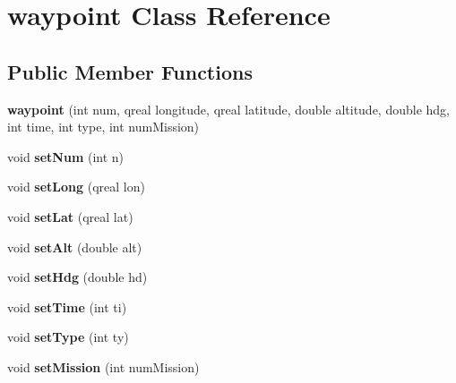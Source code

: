 \hypertarget{classwaypoint}{\section{waypoint Class Reference}
\label{classwaypoint}
}
\subsection*{Public Member Functions}
\begin{DoxyCompactItemize}
\item 
\hypertarget{classwaypoint_a48196deeabf4374d7e26b7e725293ab3}{{\bfseries waypoint} (int num, qreal longitude, qreal latitude, double altitude, double hdg, int time, int type, int num\-Mission)}\label{classwaypoint_a48196deeabf4374d7e26b7e725293ab3}

\item 
\hypertarget{classwaypoint_aad33368c517f7e01d8d2c4c9f60f6e94}{void {\bfseries set\-Num} (int n)}\label{classwaypoint_aad33368c517f7e01d8d2c4c9f60f6e94}

\item 
\hypertarget{classwaypoint_a0d3892775f4a17cd7b88ed05aa1a6223}{void {\bfseries set\-Long} (qreal lon)}\label{classwaypoint_a0d3892775f4a17cd7b88ed05aa1a6223}

\item 
\hypertarget{classwaypoint_a4380ed9b8f41100aad716fafee9ed52d}{void {\bfseries set\-Lat} (qreal lat)}\label{classwaypoint_a4380ed9b8f41100aad716fafee9ed52d}

\item 
\hypertarget{classwaypoint_a4830fdb7500a033b5fd7fdb5947f6684}{void {\bfseries set\-Alt} (double alt)}\label{classwaypoint_a4830fdb7500a033b5fd7fdb5947f6684}

\item 
\hypertarget{classwaypoint_ab52d3c16ddb10ce35fb9cc96c8658633}{void {\bfseries set\-Hdg} (double hd)}\label{classwaypoint_ab52d3c16ddb10ce35fb9cc96c8658633}

\item 
\hypertarget{classwaypoint_ad22112b48e5130c866e7d5912cac14ea}{void {\bfseries set\-Time} (int ti)}\label{classwaypoint_ad22112b48e5130c866e7d5912cac14ea}

\item 
\hypertarget{classwaypoint_ad5bcf46a1a27d181ff7037b766ec8963}{void {\bfseries set\-Type} (int ty)}\label{classwaypoint_ad5bcf46a1a27d181ff7037b766ec8963}

\item 
\hypertarget{classwaypoint_a1b2aa00a0a0696f157082fc2041fb2af}{void {\bfseries set\-Mission} (int num\-Mission)}\label{classwaypoint_a1b2aa00a0a0696f157082fc2041fb2af}


\end{DoxyCompactItemize}
